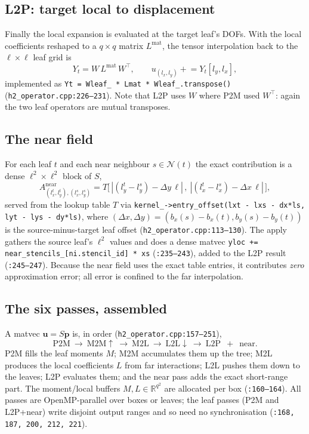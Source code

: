 \documentclass[11pt,a4paper]{article}
\newcommand{\R}{\mathbb{R}}
\newcommand{\abs}[1]{\left\lvert #1 \right\rvert}
\newcommand{\pp}{\mathbf{p}}
\newcommand{\code}[1]{\texttt{#1}}
\theoremstyle{definition}
\theoremstyle{remark}
\begin{document}
\subsection{L2P: target local to displacement}

Finally the local expansion is evaluated at the target leaf's DOFs. With the
local coefficients reshaped to a $q\times q$ matrix $L^{\text{mat}}$, the tensor
interpolation back to the $\ell\times\ell$ leaf grid is
\begin{equation}
  Y_t = W\, L^{\text{mat}}\, W^\top, \qquad
  u_{(l_x,l_y)} \mathrel{+}= Y_t[l_y,l_x],
  \label{eq:l2p}
\end{equation}
implemented as \code{Yt = Wleaf\_ * Lmat * Wleaf\_.transpose()}
(\code{h2\_operator.cpp:226--231}). Note that L2P uses $W$ where P2M used
$W^\top$: again the two leaf operators are mutual transposes.

\subsection{The near field}
\label{sec:near}

For each leaf $t$ and each near neighbour $s\in\mathcal N(t)$ the exact
contribution is a dense $\ell^2\times\ell^2$ block of $S$,
\begin{equation}
  A^{\text{near}}_{(l_x^t,l_y^t),(l_x^s,l_y^s)}
  = T\big[\,\abs{(l_y^t-l_y^s)-\Delta y\,\ell}\,,\ \abs{(l_x^t-l_x^s)-\Delta x\,\ell}\,\big],
  \label{eq:near}
\end{equation}
served from the lookup table $T$ via \code{kernel\_->entry\_offset(lxt - lxs -
dx*ls, lyt - lys - dy*ls)}, where $(\Delta x,\Delta y)=(b_x(s)-b_x(t),
b_y(s)-b_y(t))$ is the source-minus-target leaf offset
(\code{h2\_operator.cpp:113--130}). The apply gathers the source leaf's
$\ell^2$ values and does a dense matvec
\code{yloc += near\_stencils\_[ni.stencil\_id] * xs}
(\code{:235--243}), added to the L2P result (\code{:245--247}). Because the near
field uses the exact table entries, it contributes \emph{zero} approximation
error; all error is confined to the far interpolation.

\subsection{The six passes, assembled}

A matvec $\mathbf u = S\pp$ is, in order
(\code{h2\_operator.cpp:157--251}),
\[
  \text{P2M}\ \longrightarrow\ \text{M2M}\!\uparrow\ \longrightarrow\
  \text{M2L}\ \longrightarrow\ \text{L2L}\!\downarrow\ \longrightarrow\
  \text{L2P}\ \;+\;\ \text{near}.
\]
P2M fills the leaf moments $M$; M2M accumulates them up the tree; M2L produces
the local coefficients $L$ from far interactions; L2L pushes them down to the
leaves; L2P evaluates them; and the near pass adds the exact short-range part. The
moment/local buffers $M,L\in\R^{q^2}$ are allocated per box (\code{:160--164}).
All passes are OpenMP-parallel over boxes or leaves; the leaf passes
(P2M and L2P+near) write disjoint output ranges and so need no synchronisation
(\code{:168, 187, 200, 212, 221}).
\end{document}
